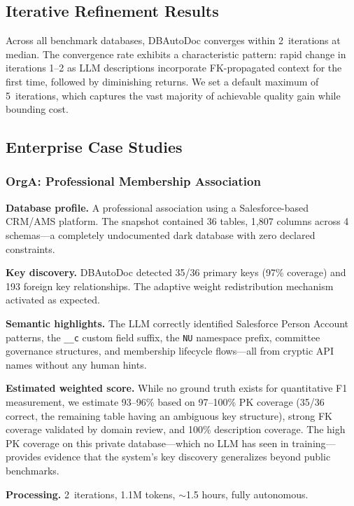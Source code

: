 \documentclass[twocolumn]{svjour3}
\begin{document}
\subsection{Iterative Refinement Results}

Across all benchmark databases, DBAutoDoc converges within 2~iterations at median. The convergence rate exhibits a characteristic pattern: rapid change in iterations 1--2 as LLM descriptions incorporate FK-propagated context for the first time, followed by diminishing returns. We set a default maximum of 5~iterations, which captures the vast majority of achievable quality gain while bounding cost.

\subsection{Enterprise Case Studies}\label{sec:enterprise}

\subsubsection{OrgA: Professional Membership Association}

\textbf{Database profile.} A professional association using a Salesforce-based CRM/AMS platform. The snapshot contained 36 tables, 1{,}807 columns across 4 schemas---a completely undocumented dark database with zero declared constraints.

\textbf{Key discovery.} DBAutoDoc detected 35/36 primary keys (97\% coverage) and 193 foreign key relationships. The adaptive weight redistribution mechanism activated as expected.

\textbf{Semantic highlights.} The LLM correctly identified Salesforce Person Account patterns, the \texttt{\_\_c} custom field suffix, the \texttt{NU} namespace prefix, committee governance structures, and membership lifecycle flows---all from cryptic API names without any human hints.

\textbf{Estimated weighted score.} While no ground truth exists for quantitative F1 measurement, we estimate 93--96\% based on 97--100\% PK coverage (35/36 correct, the remaining table having an ambiguous key structure), strong FK coverage validated by domain review, and 100\% description coverage. The high PK coverage on this private database---which no LLM has seen in training---provides evidence that the system's key discovery generalizes beyond public benchmarks.

\textbf{Processing.} 2~iterations, 1.1M tokens, $\sim$1.5 hours, fully autonomous.
\end{document}
